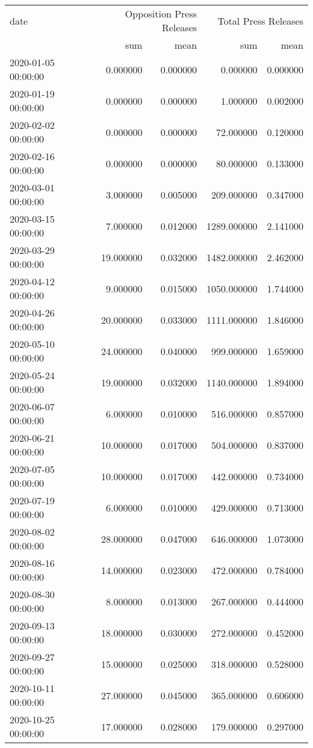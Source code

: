 \begin{tabular}{lrrrr}
\toprule
date & \multicolumn{2}{r}{Opposition Press Releases} & \multicolumn{2}{r}{Total Press Releases} \\
 & sum & mean & sum & mean \\
\midrule
2020-01-05 00:00:00 & 0.000000 & 0.000000 & 0.000000 & 0.000000 \\
2020-01-19 00:00:00 & 0.000000 & 0.000000 & 1.000000 & 0.002000 \\
2020-02-02 00:00:00 & 0.000000 & 0.000000 & 72.000000 & 0.120000 \\
2020-02-16 00:00:00 & 0.000000 & 0.000000 & 80.000000 & 0.133000 \\
2020-03-01 00:00:00 & 3.000000 & 0.005000 & 209.000000 & 0.347000 \\
2020-03-15 00:00:00 & 7.000000 & 0.012000 & 1289.000000 & 2.141000 \\
2020-03-29 00:00:00 & 19.000000 & 0.032000 & 1482.000000 & 2.462000 \\
2020-04-12 00:00:00 & 9.000000 & 0.015000 & 1050.000000 & 1.744000 \\
2020-04-26 00:00:00 & 20.000000 & 0.033000 & 1111.000000 & 1.846000 \\
2020-05-10 00:00:00 & 24.000000 & 0.040000 & 999.000000 & 1.659000 \\
2020-05-24 00:00:00 & 19.000000 & 0.032000 & 1140.000000 & 1.894000 \\
2020-06-07 00:00:00 & 6.000000 & 0.010000 & 516.000000 & 0.857000 \\
2020-06-21 00:00:00 & 10.000000 & 0.017000 & 504.000000 & 0.837000 \\
2020-07-05 00:00:00 & 10.000000 & 0.017000 & 442.000000 & 0.734000 \\
2020-07-19 00:00:00 & 6.000000 & 0.010000 & 429.000000 & 0.713000 \\
2020-08-02 00:00:00 & 28.000000 & 0.047000 & 646.000000 & 1.073000 \\
2020-08-16 00:00:00 & 14.000000 & 0.023000 & 472.000000 & 0.784000 \\
2020-08-30 00:00:00 & 8.000000 & 0.013000 & 267.000000 & 0.444000 \\
2020-09-13 00:00:00 & 18.000000 & 0.030000 & 272.000000 & 0.452000 \\
2020-09-27 00:00:00 & 15.000000 & 0.025000 & 318.000000 & 0.528000 \\
2020-10-11 00:00:00 & 27.000000 & 0.045000 & 365.000000 & 0.606000 \\
2020-10-25 00:00:00 & 17.000000 & 0.028000 & 179.000000 & 0.297000 \\

\end{tabular}
